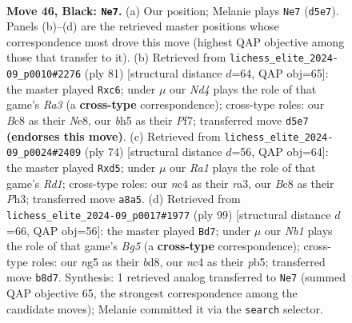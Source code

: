 \documentclass[11pt]{article}
\begin{document}
\clearpage

\begin{figure}[p]\centering
\begin{subfigure}{0.46\textwidth}\centering
\resizebox{\linewidth}{!}{%
\newchessgame
\chessboard[
  setfen={rnb5/1p4k1/4p3/3n1pNB/PpN2P2/1P4P1/6KP/7R b - - 0 46},
  showmover=false,
  pgfstyle=straightmove, color=movearrow, markmove={d5-e7}
]}
\caption{}
\end{subfigure}\hfill
\begin{subfigure}{0.46\textwidth}\centering
\resizebox{\linewidth}{!}{%
\newchessgame
\chessboard[
  setfen={4nk2/5p1p/r1Pp2p1/2p5/P1N3P1/1P1R3P/5P2/6K1 b - - 2 41},
  showmover=false,
  pgfstyle=straightmove, color=movearrow, markmove={a6-c6}
]}
\caption{}
\end{subfigure}
\\[4pt]
\begin{subfigure}{0.46\textwidth}\centering
\resizebox{\linewidth}{!}{%
\newchessgame
\chessboard[
  setfen={6k1/5pp1/p6p/1p1p1N2/1P2n1P1/r3P2P/5P2/3R2K1 w - - 0 38},
  showmover=false,
  pgfstyle=straightmove, color=movearrow, markmove={d1-d5}
]}
\caption{}
\end{subfigure}\hfill
\begin{subfigure}{0.46\textwidth}\centering
\resizebox{\linewidth}{!}{%
\newchessgame
\chessboard[
  setfen={3B4/5k2/1p3pp1/1P1p3p/2nN2bP/4P1P1/5P2/6K1 b - - 3 50},
  showmover=false,
  pgfstyle=straightmove, color=movearrow, markmove={g4-d7}
]}
\caption{}
\end{subfigure}
\caption{\textbf{Move 46, Black: \texttt{Ne7}.} (a) Our position; Melanie plays \texttt{Ne7} (\texttt{d5e7}). Panels (b)--(d) are the retrieved master positions whose correspondence most drove this move (highest QAP objective among those that transfer to it). (b) Retrieved from \texttt{lichess\_elite\_2024-09\_p0010\#2276} (ply 81) [structural distance $d$=64, QAP obj=65]: the master played \texttt{Rxc6}; under $\mu$ our \emph{Nd4} plays the role of that game's \emph{Ra3} (a \textbf{cross-type} correspondence); cross-type roles: our \emph{B}c8 as their \emph{N}e8, our \emph{b}h5 as their \emph{P}f7; transferred move \texttt{d5e7} \textbf{(endorses this move)}. (c) Retrieved from \texttt{lichess\_elite\_2024-09\_p0024\#2409} (ply 74) [structural distance $d$=56, QAP obj=64]: the master played \texttt{Rxd5}; under $\mu$ our \emph{Ra1} plays the role of that game's \emph{Rd1}; cross-type roles: our \emph{n}c4 as their \emph{r}a3, our \emph{B}c8 as their \emph{P}h3; transferred move \texttt{a8a5}. (d) Retrieved from \texttt{lichess\_elite\_2024-09\_p0017\#1977} (ply 99) [structural distance $d$=66, QAP obj=56]: the master played \texttt{Bd7}; under $\mu$ our \emph{Nb1} plays the role of that game's \emph{Bg5} (a \textbf{cross-type} correspondence); cross-type roles: our \emph{n}g5 as their \emph{b}d8, our \emph{n}c4 as their \emph{p}b5; transferred move \texttt{b8d7}. Synthesis: 1 retrieved analog transferred to \texttt{Ne7} (summed QAP objective 65, the strongest correspondence among the candidate moves); Melanie committed it via the \texttt{search} selector.}
\label{fig:thought-m91}
\end{figure}
\end{document}
